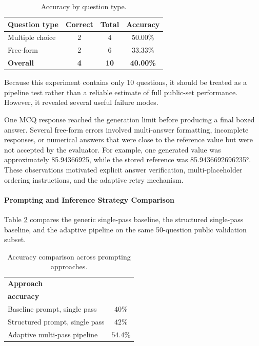 \documentclass{article}
\begin{document}
\begin{table}[h]
    \centering
    \begin{tabular}{lccc}
        \hline
        \textbf{Question type} & \textbf{Correct} & \textbf{Total} & \textbf{Accuracy} \\
        \hline
        Multiple choice & 2 & 4 & 50.00\% \\
        Free-form       & 2 & 6 & 33.33\% \\
        \hline
        \textbf{Overall} & \textbf{4} & \textbf{10} & \textbf{40.00\%} \\
        \hline
    \end{tabular}
    \caption{Accuracy by question type.}
    \label{tab:question-type-accuracy}
\end{table}

Because this experiment contains only 10 questions, it should be treated as a pipeline test rather than a reliable estimate of full public-set performance. However, it revealed several useful failure modes.

One MCQ response reached the generation limit before producing a final boxed answer. Several free-form errors involved multi-answer formatting, incomplete responses, or numerical answers that were close to the reference value but were not accepted by the evaluator. For example, one generated value was approximately 85.94366925, while the stored reference was 85.9436692696235°. These observations motivated explicit answer verification, multi-placeholder ordering instructions, and the adaptive retry mechanism.
\paragraph{Prompting and Inference Strategy Comparison}
Table \ref{tab:approach-comparison} compares the generic single-pass baseline, the structured single-pass baseline, and the adaptive pipeline on the same 50-question public validation subset.

\begin{table}[h]
    \centering
    \renewcommand{\arraystretch}{1.4}
    \begin{tabular}{p{5cm}c}
        \hline
        \textbf{Approach} &
        \shortstack{\textbf{Overall}\\\textbf{accuracy}} \\
        \hline

        Baseline prompt, single pass
        & $40\%$ \\

        Structured prompt, single pass
        & $42\%$ \\

        Adaptive multi-pass pipeline
        & $54.4\%$ \\
        \hline
    \end{tabular}
    \caption{Accuracy comparison across prompting approaches.}
    \label{tab:approach-comparison}
\end{table}
\end{document}
